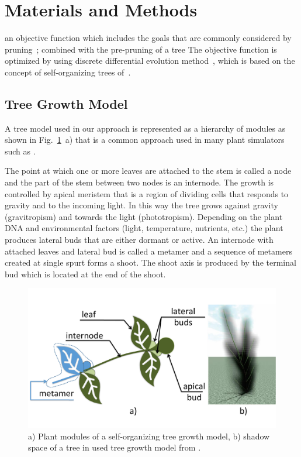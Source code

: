 \section{Materials and Methods}\label{sec:intro}
 an objective function which includes the goals that are commonly considered by pruning~\cite{}; combined
with the pre-pruning of a tree  
The objective function is optimized by using discrete differential evolution method~\cite{kohek_eduapple:_2015}, which is based on the
concept of self-organizing trees of~\cite{palubicki_self-organizing_2009}.


\subsection{Tree Growth Model}
A tree model used in our approach is represented as a hierarchy of
modules as shown in Fig.~\ref{fig:my_figure1}~a) that is a common approach used in many plant
simulators such as \cite{de_reffye_plant_1988,palubicki_self-organizing_2009,pirk_plastic_2012,prusinkiewicz_development_1988,stava_inverse_2014}. 

The point at which one or more leaves are attached to the stem is called a node and the part of the stem between two nodes is an internode. 
The growth is controlled by apical meristem that is a region of dividing cells that responds to gravity and
to the incoming light. In this way the tree grows against gravity
(gravitropism) and towards the light (phototropism). 
Depending on the plant DNA and environmental factors (light, temperature, nutrients, etc.) the plant produces lateral buds that are either dormant or active. 
An internode with attached leaves and lateral bud is called a metamer and a sequence of metamers created at single spurt forms a shoot. 
The shoot axis is produced by the terminal bud which is located at the end of the
shoot.
\begin{figure}[hbt]
    \centering
    \includegraphics[width=4.5in]{figs/Fig1}
    \caption{a) Plant modules of a self-organizing tree growth
model, b) shadow space of a tree in used tree growth model from \cite{kohek_eduapple:_2015}.}
    \label{fig:my_figure1}
\end{figure}


